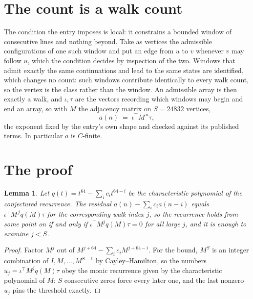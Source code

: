 \documentclass[11pt,a4paper]{article}
\theoremstyle{plain}
\newtheorem{lemma}[theorem]{Lemma}
\theoremstyle{definition}
\begin{document}
\section{The count is a walk count}

The condition the entry imposes is local: it constrains a bounded window of consecutive lines and nothing beyond. Take as vertices the admissible configurations of one such window and put an edge from $u$ to $v$ whenever $v$ may follow $u$, which the condition decides by inspection of the two. Windows that admit exactly the same continuations and lead to the same states are identified, which changes no count: such windows contribute identically to every walk count, so the vertex is the class rather than the window.
An admissible array is then exactly a walk, and $\iota,\tau$ are the vectors recording which windows may begin and end an array, so with $M$ the adjacency matrix on $S=24832$ vertices,
\[
a(n)\;=\;\iota^{\!\top}M^{\,n}\tau ,
\]
the exponent fixed by the entry's own shape and checked against its published terms. In
particular $a$ is $C$-finite.

\section{The proof}

\begin{lemma}\label{lem:crit}
Let $q(t)=t^{64}-\sum_i c_it^{64-i}$ be the characteristic polynomial of the
conjectured recurrence. The residual $a(n)-\sum_ic_ia(n-i)$ equals
$\iota^{\!\top}M^{\,j}q(M)\tau$ for the corresponding walk index $j$, so the recurrence
holds from some point on if and only if $\iota^{\!\top}M^{j}q(M)\tau=0$ for all large $j$,
and it is enough to examine $j<S$.
\end{lemma}

\begin{proof}
Factor $M^{j}$ out of $M^{j+64}-\sum_ic_iM^{j+64-i}$. For the bound, $M^{S}$
is an integer combination of $I,M,\dots,M^{S-1}$ by Cayley--Hamilton, so the numbers
$u_j=\iota^{\!\top}M^{j}q(M)\tau$ obey the monic recurrence given by the characteristic
polynomial of $M$; $S$ consecutive zeros force every later one, and the last nonzero $u_j$
pins the threshold exactly.
\end{proof}
\end{document}
